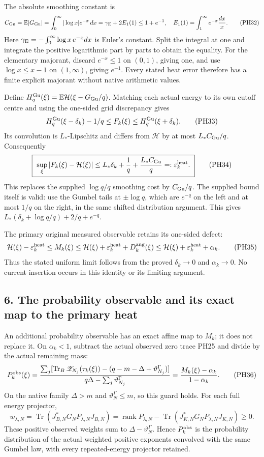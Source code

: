 \documentclass[10pt]{article}
\begin{document}
The absolute smoothing constant is \[
 C_{\rm Gu}=\mathbb E|G_{\rm Gu}|
 =\int_0^\infty|\log x|e^{-x}\,dx
 =\gamma_{\rm E}+2E_1(1)\le1+e^{-1},
 \quad E_1(1)=\int_1^\infty e^{-x}\frac{dx}{x}.
 \tag{PH32}
\] Here \(\gamma_{\rm E}=-\int_0^\infty\log x\,e^{-x}dx\) is Euler's constant. Split the integral at one and integrate the positive logarithmic part by parts to obtain the equality. For the elementary majorant, discard \(e^{-x}\le1\) on \((0,1)\), giving one, and use \(\log x\le x-1\) on \((1,\infty)\), giving \(e^{-1}\). Every stated heat error therefore has a finite explicit majorant without native arithmetic values.

Define \(H_q^{\rm Gu}(\xi)=\mathbb E\mathcal H(\xi-G_{\rm Gu}/q)\). Matching each actual energy to its own cutoff centre and using the one-sided grid discrepancy gives \[
 H_q^{\rm Gu}(\xi-\delta_k)-1/q
 \le F_k(\xi)\le H_q^{\rm Gu}(\xi+\delta_k).
 \tag{PH33}
\] Its convolution is \(L_*\)-Lipschitz and differs from \(\mathcal H\) by at most \(L_*C_{\rm Gu}/q\). Consequently \[
 \boxed{\ \sup_\xi|F_k(\xi)-\mathcal H(\xi)|
 \le L_*\delta_k+\frac1q+\frac{L_*C_{\rm Gu}}q
 =:\varepsilon_k^{\rm heat}.\ }
 \tag{PH34}
\] This replaces the supplied \(\log q/q\) smoothing cost by \(C_{\rm Gu}/q\). The supplied bound itself is valid: use the Gumbel tails at \(\pm\log q\), which are \(e^{-q}\) on the left and at most \(1/q\) on the right, in the same shifted distribution argument. This gives \(L_*(\delta_k+\log q/q)+2/q+e^{-q}\).

The primary original measured observable retains its one-sided defect: \[
 \mathcal H(\xi)-\varepsilon_k^{\rm heat}
 \le M_k(\xi)\le
 \mathcal H(\xi)+\varepsilon_k^{\rm heat}+D_k^{\rm ang}(\xi)
 \le\mathcal H(\xi)+\varepsilon_k^{\rm heat}+\alpha_k .
 \tag{PH35}
\] Thus the stated uniform limit follows from the proved \(\delta_k\to0\) and \(\alpha_k\to0\). No current insertion occurs in this identity or its limiting argument.

\subsection{6. The probability observable and its exact map to the primary heat}\label{the-probability-observable-and-its-exact-map-to-the-primary-heat}

An additional probability observable has an exact affine map to \(M_k\); it does not replace it. On \(\alpha_k<1\), subtract the actual observed zero trace PH25 and divide by the actual remaining mass: \[
 P_k^{\rm obs}(\xi)=
 \frac{\sum_j[\operatorname{Tr}_B\mathscr Z_{N_j}(\tau_k(\xi))
 -(q-m-\Delta+\vartheta_{N_j}^\Gamma)]}
 {q\Delta-\sum_j\vartheta_{N_j}^\Gamma}
 =\frac{M_k(\xi)-\alpha_k}{1-\alpha_k}.
 \tag{PH36}
\] On the native family \(\Delta>m\) and \(\vartheta_N^\Gamma\le m\), so this guard holds. For each full energy projector, \[
 w_{\lambda,N}
 =\operatorname{Tr}(J_{B,N}^*G_NP_{\lambda,N}J_{B,N})
 =\operatorname{rank}P_{\lambda,N}
 -\operatorname{Tr}(J_{K,N}^*G_NP_{\lambda,N}J_{K,N})\ge0.
\] These positive observed weights sum to \(\Delta-\vartheta_N^\Gamma\). Hence \(P_k^{\rm obs}\) is the probability distribution of the actual weighted positive exponents convolved with the same Gumbel law, with every repeated-energy projector retained.
\end{document}
